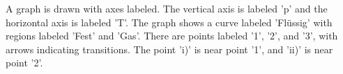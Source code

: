 A graph is drawn with axes labeled. The vertical axis is labeled 'p' and the horizontal axis is labeled 'T'. The graph shows a curve labeled 'Flüssig' with regions labeled 'Fest' and 'Gas'. There are points labeled '1', '2', and '3', with arrows indicating transitions. The point 'i)' is near point '1', and 'ii)' is near point '2'.